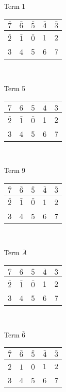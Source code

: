 \documentclass[12 pt]{article}%
\begin{document}
\begin{multicols}{4}
\begin{center}
    Term 1 \\
    \begin{tabular}{|c|c|c|c|c|}
      \hline
      $ \bar 7 $ & $ \bar 6 $ & $ \bar 5 $ & $\bar 4$ & $\bar 3 $ \\
      \hline
      $ \bar 2 $ & $ \bar 1 $ & $ \bar 0 $ & 1 & 2\\
      \hline
      3 & 4 & 5 & 6 & 7 \\
      \hline
    \end{tabular}\\
    \bigskip

    Term 5 \\
    \begin{tabular}{|c|c|c|c|c|}
      \hline
      $ \bar 7 $ & $ \bar 6 $ & $ \bar 5 $ & $\bar 4$ & $\bar 3 $ \\
      \hline
      $ \bar 2 $ & $ \bar 1 $ & $ \bar 0 $ & 1 & 2\\
      \hline
      3 & 4 & 5 & 6 & 7 \\
      \hline
    \end{tabular}\\
    \bigskip

    Term 9 \\
    \begin{tabular}{|c|c|c|c|c|}
      \hline
      $ \bar 7 $ & $ \bar 6 $ & $ \bar 5 $ & $\bar 4$ & $\bar 3 $ \\
      \hline
      $ \bar 2 $ & $ \bar 1 $ & $ \bar 0 $ & 1 & 2\\
      \hline
      3 & 4 & 5 & 6 & 7 \\
      \hline
    \end{tabular}\\
    \bigskip

    Term $\bar A$ \\
    \begin{tabular}{|c|c|c|c|c|}
      \hline
      $ \bar 7 $ & $ \bar 6 $ & $ \bar 5 $ & $\bar 4$ & $\bar 3 $ \\
      \hline
      $ \bar 2 $ & $ \bar 1 $ & $ \bar 0 $ & 1 & 2\\
      \hline
      3 & 4 & 5 & 6 & 7 \\
      \hline
    \end{tabular}\\
    \bigskip

    Term $\bar 6$ \\
    \begin{tabular}{|c|c|c|c|c|}
      \hline
      $ \bar 7 $ & $ \bar 6 $ & $ \bar 5 $ & $\bar 4$ & $\bar 3 $ \\
      \hline
      $ \bar 2 $ & $ \bar 1 $ & $ \bar 0 $ & 1 & 2\\
      \hline
      3 & 4 & 5 & 6 & 7 \\
      \hline
    \end{tabular}\\
    \bigskip


\end{center}
\end{multicols}
\end{document}
